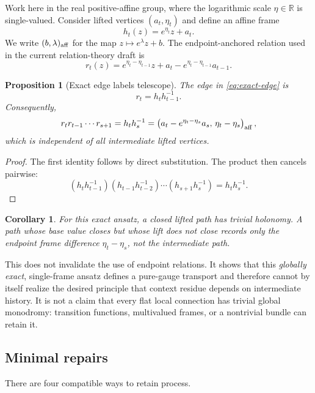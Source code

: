 \documentclass[11pt]{article}
\newtheorem{proposition}[theorem]{Proposition}
\newtheorem{corollary}[theorem]{Corollary}
\theoremstyle{definition}
\theoremstyle{remark}
\begin{document}
Work here in the real positive-affine group, where the logarithmic scale
\(\eta\in\mathbb R\) is single-valued.  Consider lifted vertices
\((a_t,\eta_t)\) and define an affine frame
\[
h_t(z)=e^{\eta_t}z+a_t.
\]
We write \((b,\lambda)_{\rm aff}\) for the map
\(z\mapsto e^\lambda z+b\).
The endpoint-anchored relation used in the current relation-theory draft is
\begin{equation}
r_t(z)
=e^{\eta_t-\eta_{t-1}}z
+a_t-e^{\eta_t-\eta_{t-1}}a_{t-1}.
\label{eq:exact-edge}
\end{equation}

\begin{proposition}[Exact edge labels telescope]
\label{prop:exact-telescope}
The edge in \eqref{eq:exact-edge} is
\[
r_t=h_t h_{t-1}^{-1}.
\]
Consequently,
\begin{equation}
r_t r_{t-1}\cdots r_{s+1}
=h_t h_s^{-1}
=
\left(
a_t-e^{\eta_t-\eta_s}a_s,\,
\eta_t-\eta_s
\right)_{\rm aff},
\label{eq:telescope}
\end{equation}
which is independent of all intermediate lifted vertices.
\end{proposition}

\begin{proof}
The first identity follows by direct substitution.  The product then cancels
pairwise:
\[
(h_t h_{t-1}^{-1})(h_{t-1}h_{t-2}^{-1})
\cdots(h_{s+1}h_s^{-1})=h_t h_s^{-1}.
\]
\end{proof}

\begin{corollary}
For this exact ansatz, a closed lifted path has trivial holonomy.  A path whose
base value closes but whose lift does not close records only the endpoint
frame difference \(\eta_t-\eta_s\), not the intermediate path.
\end{corollary}

This does not invalidate the use of endpoint relations.  It shows that this
\emph{globally exact}, single-frame ansatz defines a pure-gauge transport and
therefore cannot by itself realize the desired principle that context residue
depends on intermediate history.  It is not a claim that every flat local
connection has trivial global monodromy: transition functions, multivalued
frames, or a nontrivial bundle can retain it.

\subsection{Minimal repairs}

There are four compatible ways to retain process.
\end{document}
